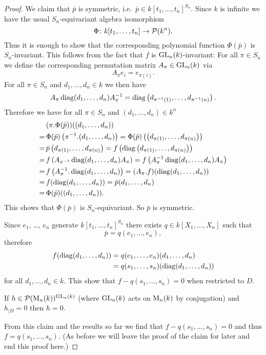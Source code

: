 \begin{proof}
  We claim that $\bar{p}$ is symmetric, i.e.\ $\bar{p} \in k[t_1, \dotsc, t_n]^{S_n}$.
  Since $k$ is infinite we have the usual $S_n$-equivariant algebra isomorphism
  \[
            \Phi
    \colon  k[t_1, \dotsc, t_n]
    \to     \mathcal{P}(k^n).
  \]
  Thus it is enough to show that the corresponding polynomial function $\Phi(\bar{p})$ is $S_n$-invariant.
  This follows from the fact that $f$ is $\operatorname{GL}_n(k)$-invariant:
  For all $\pi \in S_n$ we define the corresponding permutation matrix $A_\pi \in \operatorname{GL}_n(k)$ via
  \[
      A_\pi e_i
    = e_{\pi(i)}.
  \]
  For all $\pi \in S_n$ and $d_1, \dotsc, d_n \in k$ we then have
  \[
      A_\pi \operatorname{diag}(d_1, \dotsc, d_n) A_\pi^{-1}
    = \operatorname{diag}\left( d_{\pi^{-1}(1)}, \dotsc, d_{\pi^{-1}(n)} \right).
  \]
  Therefore we have for all $\pi \in S_n$ and $(d_1, \dotsc, d_n) \in k^n$
  \begin{align*}
     &\,  (\pi.\Phi(\bar{p}))((d_1, \dotsc, d_n)) \\
    =&\,  \Phi(\bar{p})\left( \pi^{-1}.(d_1, \dotsc, d_n) \right)
     =    \Phi(\bar{p})\left( \left(d_{\pi(1)}, \dotsc, d_{\pi(n)}\right) \right) \\
    =&\,  \bar{p}\left( d_{\pi(1)}, \dotsc, d_{\pi(n)} \right)
     =    f\left( \operatorname{diag}\left( d_{\pi(1)}, \dotsc, d_{\pi(n)} \right) \right) \\
    =&\,  f\left( A_{\pi^{-1}} \operatorname{diag}(d_1, \dotsc, d_n) A_\pi \right)
     =    f\left( A_\pi^{-1} \operatorname{diag}(d_1, \dotsc, d_n) A_\pi \right) \\
    =&\,  f\left( A_\pi^{-1}.\operatorname{diag}(d_1, \dotsc, d_n) \right)
     =    (A_\pi.f)(\operatorname{diag}(d_1, \dotsc, d_n)) \\
    =&\,  f(\operatorname{diag}(d_1, \dotsc, d_n))
     =    \bar{p}(d_1, \dotsc, d_n) \\
    =&\,  \Phi(\bar{p})((d_1, \dotsc, d_n)).
  \end{align*}
  This shows that $\Phi(\bar{p})$ is $S_n$-equivariant.
  So $\bar{p}$ is symmetric.
  
  Since $e_1$, \dots, $e_n$ generate $k[t_1, \dotsc, t_n]^{S_n}$ there exists $q \in k[X_1, \dotsc, X_n]$ such that
  \[
      \bar{p}
    = q(e_1, \dotsc, e_n),
  \]
  therefore
  \begin{align*}
        f(\operatorname{diag}(d_1, \dotsc, d_n))
    &=  q(e_1, \dotsc, e_n)(d_1, \dotsc, d_n) \\
    &=  q(s_1, \dotsc, s_n)(\operatorname{diag}(d_1, \dotsc, d_n))
  \end{align*}
  for all $d_1, \dotsc, d_n \in k$.
  This show that $f-q(s_1, \dotsc, s_n) = 0$ when restricted to $D$.
  
  \begin{claim}
    If $h \in \mathcal{P}(\operatorname{M}_n(k))^{\operatorname{GL}_n(k)}$ (where $\operatorname{GL}_n(k)$ acts on $\operatorname{M}_n(k)$ by conjugation) and $h_{|D} = 0$ then $h = 0$.
  \end{claim}

  From this claim and the results so far we find that $f - q(s_1, \dotsc, s_n) = 0$ and thus $f = q(s_1, \dotsc, s_n)$.
  (As before we will leave the proof of the claim for later and end this proof here.)
\end{proof}


